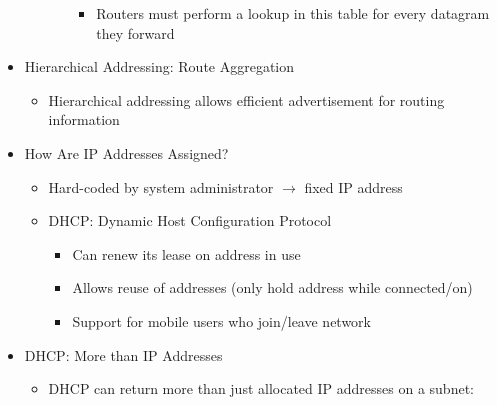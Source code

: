 \begin{itemize}
\begin{itemize}
\begin{itemize}
\begin{itemize}
              \item Routers must perform a lookup in this table for every datagram they forward

            \end{itemize}

        \end{itemize}

    \end{itemize}

  \item Hierarchical Addressing: Route Aggregation

    \begin{itemize}

      \item Hierarchical addressing allows efficient advertisement for routing information

    \end{itemize}

  \item How Are IP Addresses Assigned?

    \begin{itemize}

      \item Hard-coded by system administrator $\to$ fixed IP address

      \item DHCP: Dynamic Host Configuration Protocol

        \begin{itemize}

          \item Can renew its lease on address in use

          \item Allows reuse of addresses (only hold address while connected/on)

          \item Support for mobile users who join/leave network

        \end{itemize}

    \end{itemize}

  \item DHCP: More than IP Addresses

    \begin{itemize}

      \item DHCP can return more than just allocated IP addresses on a subnet:


\end{itemize}
\end{itemize}
